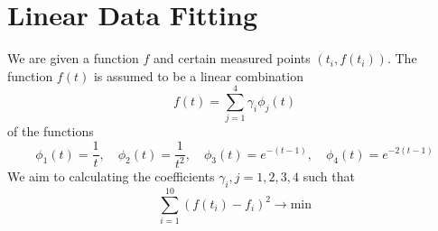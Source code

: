 \documentclass{article}
\begin{document}
\section*{Linear Data Fitting}
We are given a function $f$ and certain measured points $\left(t_{i}, f\left(t_{i}\right)\right)$. The function $f\left(t\right)$ is assumed to be a linear combination
\begin{equation*}
    f\left(t\right) = \sum_{j=1}^{4}\gamma_{i}\phi_{j}\left(t\right)
\end{equation*}
of the functions
\begin{equation*}
    \phi_{1}\left(t\right) = \frac{1}{t}, \quad \phi_{2}\left(t\right) = \frac{1}{t^{2}}, \quad \phi_{3}\left(t\right) = e^{-\left(t-1\right)}, \quad \phi_{4}\left(t\right) = e^{-2\left(t-1\right)}
\end{equation*}
We aim to calculating the coefficients $\gamma_{i}, j = 1,2,3,4$ such that
\begin{equation*}
\sum_{i=1}^{10}\left(f\left(t_{i}\right) - f_{i}\right)^{2} \longrightarrow \text{min}
\end{equation*}
\end{document}
